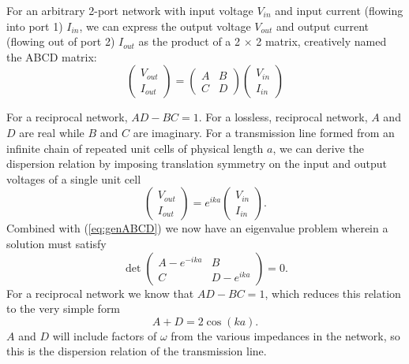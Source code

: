 For an arbitrary 2-port network with input voltage $V_{in}$ and input current (flowing into port 1) $I_{in}$, we can express the output voltage $V_{out}$ and output current (flowing out of port 2) $I_{out}$ as the product of a 2 $\times$ 2 matrix, creatively named the ABCD matrix:
\begin{equation}
\left( \begin{array}{c}
V_{out} \\
I_{out} \end{array} \right) =
\left( \begin{array}{cc}
A & B \\
C & D \end{array} \right)
\left( \begin{array}{c}
V_{in} \\
I_{in} \end{array} \right)
\label{eq:genABCD}
\end{equation}

For a reciprocal network, $AD-BC = 1$.  For a lossless, reciprocal network, $A$ and $D$ are real while $B$ and $C$ are imaginary.  For a transmission line formed from an infinite chain of repeated unit cells of physical length $a$, we can derive the dispersion relation by imposing translation symmetry on the input and output voltages of a single unit cell
\begin{equation}
\left( \begin{array}{c}
V_{out} \\
I_{out} \end{array} \right) =
e^{ika}
\left( \begin{array}{c}
V_{in} \\
I_{in} \end{array} \right).
\label{eq:transsym}
\end{equation}
Combined with (\ref{eq:genABCD}) we now have an eigenvalue problem wherein a solution must satisfy
\begin{equation}
\det
\left( \begin{array}{cc}
A - e^{-ika} & B \\
C & D - e^{ika} \end{array} \right)
= 0.
\label{eq:eig}
\end{equation}
For a reciprocal network we know that $AD-BC=1$, which reduces this relation to the very simple form
\begin{equation}
A + D = 2 \cos(ka).
\label{eq:disp}
\end{equation}
$A$ and $D$ will include factors of $\omega$ from the various impedances in the network, so this is the dispersion relation of the transmission line.

